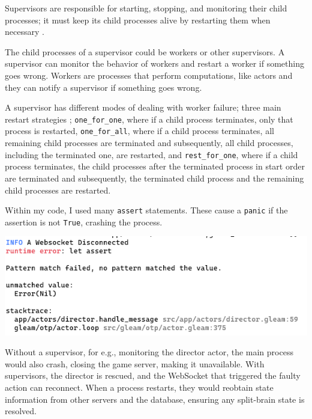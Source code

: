\documentclass[]{final}
\begin{document}
Supervisors are responsible for starting, stopping, and monitoring their child
processes; it must keep its child processes alive by restarting them when
necessary \cite{noauthor_gleam-otp-design-principals/gleam-otp-design-principals.org_nodate, noauthor_supervisor_nodate}.

\newpage

The child processes of a supervisor could be workers or other supervisors.
A supervisor can monitor the behavior of workers and restart a worker if something
goes wrong.
Workers are processes that perform computations, like actors and they can
notify a supervisor if something goes wrong.

A supervisor has different modes of dealing with worker failure; three main
restart strategies \cite{noauthor_supervisor_nodate};
\lstinline|one_for_one|, where if a child process terminates, only that process
is restarted, \lstinline|one_for_all|, where
if a child process terminates, all remaining child processes are terminated and
subsequently, all child processes, including the terminated one, are restarted,
and \lstinline|rest_for_one|, where
if a child process terminates, the child processes after the terminated process
in start order are terminated and subsequently, the terminated child
process and the remaining child processes are restarted.

\noindent
\begin{minipage}[t]{18em}
  Within my code, I used many \lstinline|assert| statements. These cause
  a \lstinline|panic| if the assertion is not \lstinline|True|, crashing the
  process.
\end{minipage}
\hfill
\begin{minipage}[t]{20em}
  \includegraphics[width=\linewidth]{assert_panic}
  \label{fig: 20}
\end{minipage}

Without a supervisor, for e.g., monitoring the director actor, the main process would
also crash, closing the game server, making it unavailable. With supervisors, the director is rescued, and the WebSocket that triggered
the faulty action can reconnect. When a process restarts,
they would reobtain state information from other servers and the database,
ensuring any split-brain state is resolved.
\end{document}
